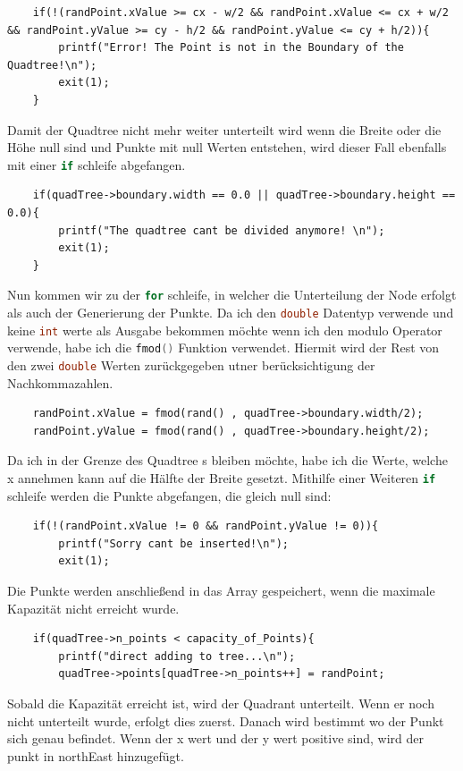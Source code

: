 \documentclass[11pt]{article}
\newcommand{\qt}{Quadtree }
\newcommand{\lstin}[1]{\lstinline[language=C]{#1}}
\begin{document}
\begin{lstlisting}
    if(!(randPoint.xValue >= cx - w/2 && randPoint.xValue <= cx + w/2 && randPoint.yValue >= cy - h/2 && randPoint.yValue <= cy + h/2)){
        printf("Error! The Point is not in the Boundary of the Quadtree!\n");
        exit(1); 
    }
\end{lstlisting}
Damit der \qt nicht mehr weiter unterteilt wird wenn die Breite oder die Höhe null sind und  Punkte mit null Werten entstehen, wird dieser Fall ebenfalls mit einer \lstin{if} schleife abgefangen. 
\begin{lstlisting}
    if(quadTree->boundary.width == 0.0 || quadTree->boundary.height == 0.0){
        printf("The quadtree cant be divided anymore! \n");
        exit(1); 
    }
\end{lstlisting}
Nun kommen wir zu der \lstin{for} schleife, in welcher die Unterteilung der Node erfolgt als auch der Generierung der Punkte.\newline
Da ich den \lstin{double} Datentyp verwende und keine \lstin{int} werte als Ausgabe bekommen möchte wenn ich den modulo Operator verwende, habe ich die \lstin{fmod()} Funktion verwendet. Hiermit wird der Rest von den zwei \lstin{double} Werten zurückgegeben utner berücksichtigung der Nachkommazahlen. 
\begin{lstlisting}
    randPoint.xValue = fmod(rand() , quadTree->boundary.width/2); 
    randPoint.yValue = fmod(rand() , quadTree->boundary.height/2); 
\end{lstlisting}
Da ich in der Grenze des \qt s bleiben möchte, habe ich die Werte, welche x annehmen kann auf die Hälfte der Breite gesetzt. 
Mithilfe einer Weiteren \lstin{if} schleife werden die Punkte abgefangen, die gleich null sind: 
\begin{lstlisting}
    if(!(randPoint.xValue != 0 && randPoint.yValue != 0)){
        printf("Sorry cant be inserted!\n");
        exit(1);
\end{lstlisting}
Die Punkte werden anschließend in das Array gespeichert, wenn die maximale Kapazität nicht erreicht wurde. 
\begin{lstlisting}
    if(quadTree->n_points < capacity_of_Points){
        printf("direct adding to tree...\n");
        quadTree->points[quadTree->n_points++] = randPoint; 
\end{lstlisting}
Sobald die Kapazität erreicht ist, wird der Quadrant unterteilt. Wenn er noch nicht unterteilt wurde, erfolgt dies zuerst. Danach wird bestimmt wo der Punkt sich genau befindet. Wenn der x wert und der y wert positive sind, wird der punkt in northEast hinzugefügt.
\end{document}
